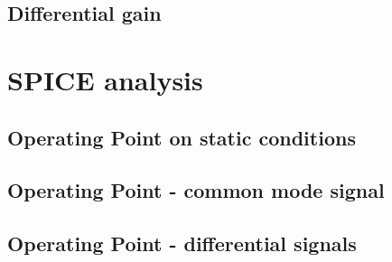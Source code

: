 \documentclass[10pt,a4paper]{book}
\begin{document}
\subsection{Differential gain}


\section{SPICE analysis}
\subsection{Operating Point on static conditions}



\subsection{Operating Point - common mode signal}



\subsection{Operating Point - differential signals}


\end{document}
